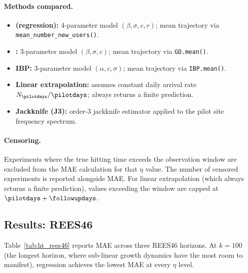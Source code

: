 {\paragraph{Methods compared.}
\begin{itemize}[leftmargin=*]
  \item \textbf{\nbmodel (regression):} 4-parameter model
        $(\beta, \sigma, c, r)$; mean trajectory via
        \texttt{mean\_number\_new\_users()}.
  \item \textbf{\tgmodel:} 3-parameter model
        $(\beta, \sigma, c)$; mean trajectory via \texttt{GD.mean()}.
  \item \textbf{IBP:} 3-parameter model
        $(\alpha, c, \sigma)$; mean trajectory via \texttt{IBP.mean()}.
  \item \textbf{Linear extrapolation:} assumes constant daily
        arrival rate $N_{\pilotdays}/\pilotdays$; always returns a
        finite prediction.
  \item \textbf{Jackknife (J3):} order-3 jackknife estimator
        applied to the pilot site frequency spectrum.
\end{itemize}

\paragraph{Censoring.}
Experiments where the true hitting time exceeds the observation
window are excluded from the MAE calculation for that $\eta$ value.
The number of censored experiments is reported alongside MAE.
For linear extrapolation (which always returns a finite prediction),
values exceeding the window are capped at $\pilotdays + \followupdays$.


\subsection{Results: REES46}

Table~\ref{tab:ht_rees46} reports MAE across three REES46 horizons.
At $k = 100$ (the longest horizon, where sub-linear growth dynamics
have the most room to manifest), \nbmodel regression achieves the
lowest MAE at every $\eta$ level.

}
